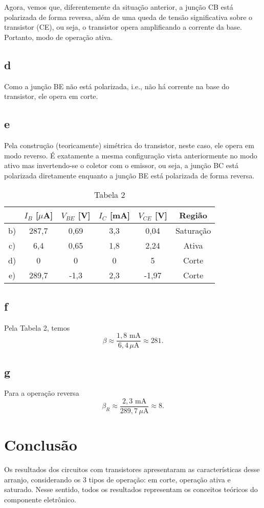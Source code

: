 \documentclass[a4paper]{report}
\begin{document}
Agora, vemos que, diferentemente da situação anterior, a junção CB está polarizada de forma reversa, além de uma queda de tensão significativa sobre o transistor (CE), ou seja, o transistor opera amplificando a corrente da base. Portanto, modo de operação ativa.

\subsection*{d}

Como a junção BE não está polarizada, i.e., não há corrente na base do transistor, ele opera em corte.

\subsection*{e}

Pela construção (teoricamente) simétrica do transistor, neste caso, ele opera em modo reverso. É exatamente a mesma configuração vista anteriormente no modo ativo mas invertendo-se o coletor com o emissor, ou seja, a junção BC está polarizada diretamente enquanto a junção BE está polarizada de forma reversa.

\begin{table}[H]
    \centering
    \caption*{Tabela 2}
    \begin{tabular}{c | c | c | c | c | c}
     & $I_B$ [$\mu$A] & $V_{BE}$ [V] & $I_C$ [mA] & $V_{CE}$ [V] & Região \\
     \hline
	b) & 287,7 & 0,69 & 3,3 & 0,04 & Saturação \\
	c) & 6,4 & 0,65 & 1,8 & 2,24 & Ativa \\
	d) & 0 & 0 & 0 & 5 & Corte \\
	e) & 289,7 & -1,3 & 2,3 & -1,97 & Corte \\
    \end{tabular}
\end{table}

\subsection*{f}

Pela Tabela 2, temos \[
\beta \approx \frac{1,8 \text{ mA}}{6,4\,\mu\text{A}} \approx 281
.\]

\subsection*{g}

Para a operação reversa \[
\beta_R \approx \frac{2,3 \text{ mA}}{289,7\,\mu\text{A}} \approx 8
.\] 

\section{Conclusão}

Os resultados dos circuitos com transistores apresentaram as características desse arranjo, considerando os 3 tipos de operação: em corte, operação ativa e saturado. Nesse sentido, todos os resultados representam os conceitos teóricos do componente eletrônico.
\end{document}
